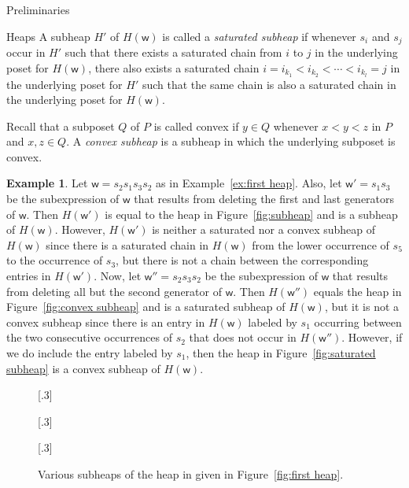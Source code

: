\documentclass[11pt]{amsart}
\theoremstyle{definition}
\newtheorem{example}[theorem]{Example}
\numberwithin{equation}{section}
\renewcommand{\(}{\left(}
\renewcommand{\)}{\right)}
\newcommand{\w}{\mathsf{w}}
\newcommand\xxaxis{0}
\newcommand\yyaxis{90}
\newcommand\heapblock[3]{\fill[draw=black, fill=gray!30, rounded corners, line width=1.1pt, shift={(\xxaxis:#1)},shift={(\yyaxis:#2)}] (-1,-0.5) rectangle (1,0.5);\node at (#1,#2) {$#3$};}
\begin{document}
\begin{section}{Preliminaries}
\begin{subsection}{Heaps}
A subheap $H'$ of $H(\w)$ is called a \emph{saturated subheap} if whenever $s_{i}$ and $s_{j}$ occur in $H'$ such that there exists a saturated chain from $i$ to $j$ in the underlying poset for $H(\w)$, there also exists a saturated chain $i=i_{k_{1}}<i_{k_{2}}< \cdots < i_{k_{l}}=j$ in the underlying poset for $H'$ such that the same chain is also a saturated chain in the underlying poset for $H(\w)$.

Recall that a subposet $Q$ of $P$ is called convex if $y \in Q$ whenever $x < y < z$ in $P$ and $x, z \in Q$.  A \emph{convex subheap} is a subheap in which the underlying subposet is convex.

\begin{example}\label{ex:third heap}
Let $\w= s_2 s_1 s_3 s_2$ as in Example~\ref{ex:first heap}.  Also, let $\w'=s_1 s_3$ be the subexpression of $\w$ that results from deleting the first and last generators of $\w$.  Then $H(\w')$ is equal to the heap in Figure~\ref{fig:subheap} and is a subheap of $H(\w)$.  However, $H(\w')$ is neither a saturated nor a convex subheap of $H(\w)$ since there is a saturated chain in $H(\w)$ from the lower occurrence of $s_{5}$ to the occurrence of $s_{3}$, but there is not a chain between the corresponding entries in $H(\w')$.  Now, let $\w''=s_{2}s_{3}s_{2}$ be the subexpression of $\w$ that results from deleting all but the second generator of $\w$.  Then $H(\w'')$ equals the heap in Figure~\ref{fig:convex subheap} and is a saturated subheap of $H(\w)$, but it is not a convex subheap since there is an entry in $H(\w)$ labeled by $s_{1}$ occurring between the two consecutive occurrences of $s_{2}$ that does not occur in $H(\w'')$.  However, if we do include the entry labeled by $s_{1}$, then the heap in Figure~\ref{fig:saturated subheap}  is a convex subheap of $H(\w)$.  
\end{example}

\begin{figure}[!ht]
\subcaptionbox{\label{fig:subheap}}[.3\textwidth]{
}
\subcaptionbox{\label{fig:convex subheap}}[.3\textwidth]{
}
\subcaptionbox{\label{fig:saturated subheap}}[.3\textwidth]{
}
\caption{Various subheaps of the heap in given in Figure~\ref{fig:first heap}.}
\label{fig:subheaps}
\end{figure}


\end{subsection}
\end{section}
\end{document}
